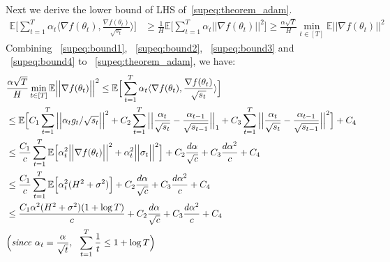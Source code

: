 \documentclass{article}
\begin{document}
Next we derive the lower bound of LHS of~\eqref{supeq:theorem_adam}.
\begin{align}
\label{supeq:bound4}
\mathbb{E}\Big[ \sum_{t=1}^T \alpha_t \langle \nabla f(\theta_t ), \frac{\nabla f(\theta_t )}{\sqrt{s_t}} \rangle \Big] & \geq \frac{1}{H} \mathbb{E} \Big[ \sum_{t=1}^T \alpha_t \Big \vert \Big \vert \nabla f(\theta_t ) \Big \vert \Big \vert^2 \Big] \geq \frac{\alpha \sqrt{T}}{H} \operatorname*{min}_{t \in [T]} \mathbb{E} \Big \vert \Big \vert \nabla f(\theta_t ) \Big \vert \Big \vert^2
\end{align}
Combining ~\eqref{supeq:bound1}, ~\eqref{supeq:bound2}, ~\eqref{supeq:bound3} and ~\eqref{supeq:bound4} to ~\eqref{supeq:theorem_adam}, we have:
\begin{align}
&\frac{\alpha \sqrt{T}}{H} \operatorname*{min}_{t \in [T]} \mathbb{E} \Big \vert \Big \vert \nabla f(\theta_t ) \Big \vert \Big \vert^2
\leq
\mathbb{E}\Big[ \sum_{t=1}^T \alpha_t \langle \nabla f(\theta_t ), \frac{\nabla f(\theta_t )}{\sqrt{s_t}} \rangle \Big] \nonumber \\
&\leq \mathbb{E} \Big[ C_1 \sum_{t=1}^T \Big \vert \Big \vert \alpha_t g_t/ \sqrt{s_t} \Big \vert \Big \vert^2 
+ C_2 \sum_{t=1}^T \Big \vert \Big \vert \frac{\alpha_t}{\sqrt{s_t}} - \frac{\alpha_{t-1}}{ \sqrt{ s_{t-1}}} \Big \vert \Big \vert_1 + C_3 \sum_{t=1}^T \Big \vert \Big \vert \frac{\alpha_t}{\sqrt{s_t}} - \frac{\alpha_{t-1}}{\sqrt{s_{t-1}}} \Big \vert \Big \vert^2 \Big] + C_4 \nonumber \\
& \leq \frac{C_1}{c} \sum_{t=1}^T \mathbb{E} \Big[{\color{black} \alpha_t^2 \Big \vert \Big \vert \nabla f(\theta_t ) \Big \vert \Big \vert^2 + \alpha_t ^2 \Big \vert \Big \vert \sigma_t \Big \vert \Big \vert^2} \Big] + C_2 \frac{d \alpha}{\sqrt{c}} + C_3 \frac{d \alpha^2}{c} + C_4 \label{supeq:sigma_bound} \\
& \leq \frac{C_1}{c} \sum_{t=1}^T \mathbb{E} \Big[{\color{black} \alpha_t^2 (H^2 + \sigma^2)} \Big] + C_2 \frac{d \alpha}{\sqrt{c}} + C_3 \frac{d \alpha^2}{c} + C_4 \nonumber \\
& \leq \frac{C_1 {\color{black} \alpha^2 (H^2 + \sigma^2)}(1+\log T)}{c} + C_2 \frac{d \alpha}{\sqrt{c}} + C_3 \frac{d \alpha^2}{c} + C_4  \label{supeq:bound5} \\
& \Big( \textit{since\ } \alpha_t = \frac{\alpha}{\sqrt{t}},\ \  \sum_{t=1}^T \frac{1}{t} \leq 1 + \log T \Big) \nonumber
\end{align} 
\end{document}
